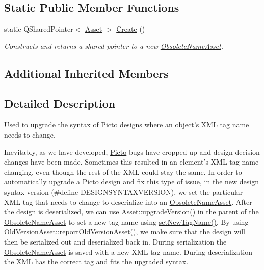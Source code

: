 \subsection*{Static Public Member Functions}
\begin{DoxyCompactItemize}
\item 
\hypertarget{class_picto_1_1_obsolete_name_asset_ae751f85ec576d7dd4e20a9559e43fa54}{static Q\-Shared\-Pointer$<$ \hyperlink{class_picto_1_1_asset}{Asset} $>$ \hyperlink{class_picto_1_1_obsolete_name_asset_ae751f85ec576d7dd4e20a9559e43fa54}{Create} ()}\label{class_picto_1_1_obsolete_name_asset_ae751f85ec576d7dd4e20a9559e43fa54}

\begin{DoxyCompactList}\small\item\em Constructs and returns a shared pointer to a new \hyperlink{class_picto_1_1_obsolete_name_asset}{Obsolete\-Name\-Asset}. \end{DoxyCompactList}\end{DoxyCompactItemize}
\subsection*{Additional Inherited Members}


\subsection{Detailed Description}
Used to upgrade the syntax of \hyperlink{namespace_picto}{Picto} designs where an object's X\-M\-L tag name needs to change. 

Inevitably, as we have developed, \hyperlink{namespace_picto}{Picto} bugs have cropped up and design decision changes have been made. Sometimes this resulted in an element's X\-M\-L tag name changing, even though the rest of the X\-M\-L could stay the same. In order to automatically upgrade a \hyperlink{namespace_picto}{Picto} design and fix this type of issue, in the new design syntax version (\#define D\-E\-S\-I\-G\-N\-S\-Y\-N\-T\-A\-X\-V\-E\-R\-S\-I\-O\-N), we set the particular X\-M\-L tag that needs to change to deserialize into an \hyperlink{class_picto_1_1_obsolete_name_asset}{Obsolete\-Name\-Asset}. After the design is deserialized, we can use \hyperlink{class_picto_1_1_asset_aacaaedf9d76c3af2c7168d5c14fed914}{Asset\-::upgrade\-Version()} in the parent of the \hyperlink{class_picto_1_1_obsolete_name_asset}{Obsolete\-Name\-Asset} to set a new tag name using \hyperlink{class_picto_1_1_obsolete_name_asset_aca62d0a7a2e27330ed5c3b406c4a8301}{set\-New\-Tag\-Name()}. By using \hyperlink{class_picto_1_1_old_version_asset_ae0813a051e7dd735a8ae1a86319e4535}{Old\-Version\-Asset\-::report\-Old\-Version\-Asset()}, we make sure that the design will then be serialized out and deserialized back in. During serialization the \hyperlink{class_picto_1_1_obsolete_name_asset}{Obsolete\-Name\-Asset} is saved with a new X\-M\-L tag name. During deserialization the X\-M\-L has the correct tag and fits the upgraded syntax.

